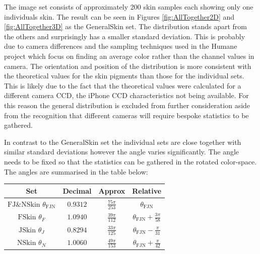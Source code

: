 The image set consists of approximately 200 skin samples  each showing only one individuals skin. The result can be seen in Figures \ref{fig:AllTogether2D} and \ref{fig:AllTogether3D} as the GeneralSkin set. The distribution stands apart from the others and surprisingly has a smaller standard deviation. This is probably due to camera differences and the sampling techniques used in the Humane project which focus on finding an average color rather than the channel values in camera. The orientation and position of the distribution is more consistent with the theoretical values for the skin pigments than those for the individual sets. This is likely due to the fact that the theoretical values were calculated for a different camera CCD, the iPhone CCD characteristics not being available. For this reason the general distribution is excluded from further consideration aside from the recognition that different cameras will require bespoke statistics to be gathered. 

In contrast to the GeneralSkin set the individual sets are close together with similar standard deviations however the angle varies significantly. The angle needs to be fixed so that the statistics can be gathered in the rotated color-space. The angles are summarised in the table below:

\begin{tabular}{|c|c|c|c|}
\hline   Set                                                             & Decimal   & Approx                       & Relative \\ 
\hline   $\text{FJ$\&$NSkin }\theta _{\text{FJN}}$ & $0.9312$ & $\frac{75 \pi }{253}$ & $\theta _{\text{FJN}}$ \\
\hline   $\text{FSkin }\theta _F$                            & $1.0940$ & $\frac{39 \pi }{112}$ & $\theta _{\text{FJN}}+\frac{3 \pi }{58}$ \\
\hline   $\text{JSkin }\theta _J$                             & $0.8294$ & $\frac{33 \pi }{125}$ & $\theta _{\text{FJN}}-\frac{\pi }{31}$ \\
\hline   $\text{NSkin }\theta _N$                          & $1.0060$ & $\frac{49 \pi }{153}$ & $\theta _{\text{FJN}}+\frac{\pi }{42} $\\
\hline 
\end{tabular} 

